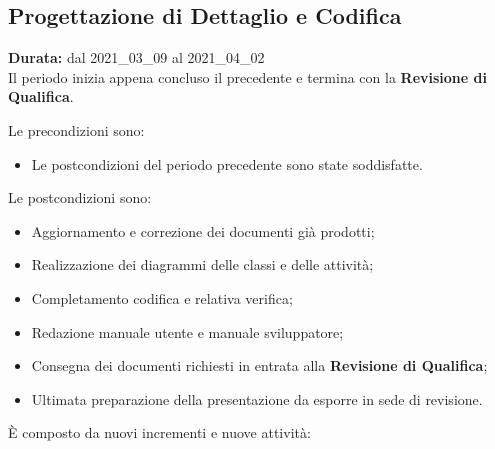 \subsection{Progettazione di Dettaglio e Codifica}
\label{progettazione_di_dettaglio}
\textbf{Durata:} dal 2021\_03\_09 al 2021\_04\_02 \\
Il periodo inizia appena concluso il precedente e termina con la \textbf{Revisione di Qualifica}. 

Le precondizioni sono:
\begin{itemize}
    \item Le postcondizioni del periodo precedente sono state soddisfatte.
\end{itemize}

Le postcondizioni sono:
\begin{itemize}
    \item Aggiornamento e correzione dei documenti già prodotti;
    \item Realizzazione dei diagrammi delle classi e delle attività;
    \item Completamento codifica e relativa verifica;
    \item Redazione manuale utente e manuale sviluppatore;
    \item Consegna dei documenti richiesti in entrata alla \textbf{Revisione di Qualifica};
    \item Ultimata preparazione della presentazione da esporre in sede di revisione.
\end{itemize}
È composto da nuovi incrementi e nuove attività:

